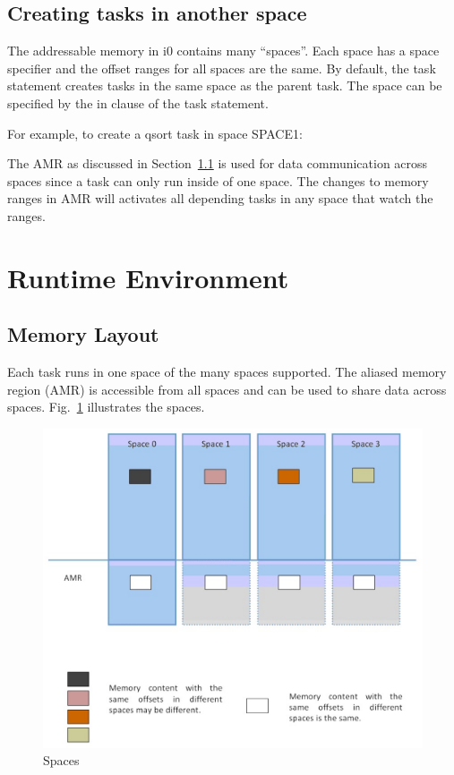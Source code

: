 \documentclass[a4paper]{article}
\begin{document}
{{\subsection{Creating tasks in another space}}}

The addressable memory in i0 contains many ``spaces''. Each space has a space specifier and the offset ranges for all spaces are the same. By default, the task statement creates tasks in the same space as the parent task. The space can be specified by the in clause of the task statement.

For example, to create a qsort task in space SPACE1:

{\color{blue}{}}

The AMR as discussed in Section~\ref{mem-layout} is used for data communication across spaces since a task can only run inside of one space. The changes to memory ranges in AMR will activates all depending tasks in any space that watch the ranges.

{\section{Runtime Environment}}

\subsection{Memory Layout}
\label{mem-layout}

Each task runs in one space of the many spaces supported. The aliased memory region (AMR) is accessible from all spaces and can be used to share data across spaces. Fig.~\ref{fig:c0-spaces} illustrates the spaces.

\begin{figure}[htbp]
\begin{center}
  \includegraphics[width=5in]{figure/spaces.eps}
  \caption{Spaces}
  \label{fig:c0-spaces}
\end{center}
\end{figure}
\end{document}

